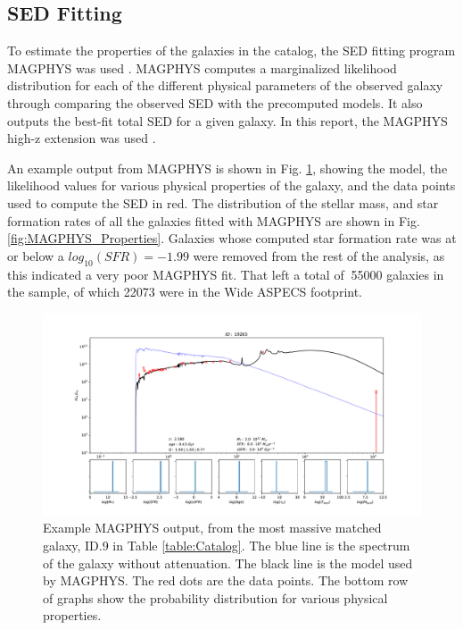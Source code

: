 


\subsection{SED Fitting}

To estimate the properties of the galaxies in the catalog, the SED fitting program MAGPHYS was used \cite{da2008simple, da2015alma}. MAGPHYS computes a marginalized likelihood distribution for each of the different physical parameters of the observed galaxy through comparing the observed SED with the precomputed models. It also outputs the best-fit total SED for a given galaxy. In this report, the MAGPHYS high-z extension was used \cite{da2015alma}.

An example output from MAGPHYS is shown in Fig. \ref{fig:MAGPHYS_Example}, showing the model, the likelihood values for various physical properties of the galaxy, and the data points used to compute the SED in red. The distribution of the stellar mass, and star formation rates of all the galaxies fitted with MAGPHYS are shown in Fig. \ref{fig:MAGPHYS_Properties}. Galaxies whose computed star formation rate was at or below a $log_{10}(SFR) = -1.99$ were removed from the rest of the analysis, as this indicated a very poor MAGPHYS fit. That left a total of $~$55000 galaxies in the sample, of which 22073 were in the Wide ASPECS footprint.

\begin{figure}[tbp]
\centering \includegraphics[width=120mm]{19265.pdf}
\caption{Example MAGPHYS output, from the most massive matched galaxy, ID.9 in Table \ref{table:Catalog}. The blue line is the spectrum of the galaxy without attenuation. The black line is the model used by MAGPHYS. The red dots are the data points. The bottom row of graphs show the probability distribution for various physical properties.}
\label{fig:MAGPHYS_Example}
\end{figure}

